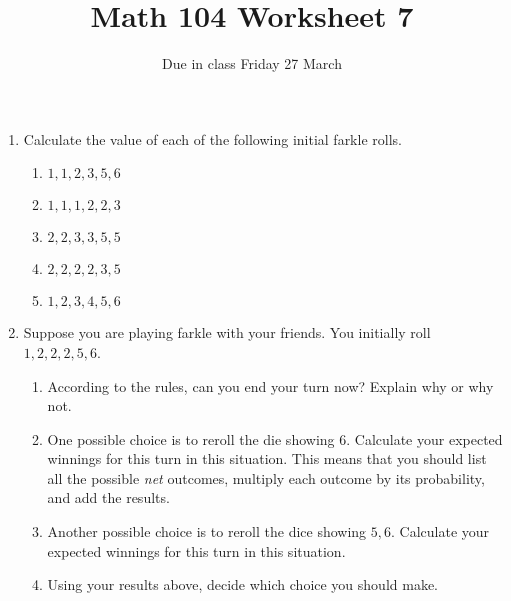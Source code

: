 \documentclass[12pt]{article}
\author{}\date{Due in class Friday 27 March}
\title{Math 104 Worksheet 7}\author{}
\begin{document}
\maketitle
\thispagestyle{empty}
\begin{enumerate}
\item Calculate the value of each of the following
initial farkle rolls.
\begin{enumerate}
\item $1,1,2,3,5,6$
\item $1,1,1,2,2,3$
\item $2,2,3,3,5,5$
\item $2,2,2,2,3,5$
\item $1,2,3,4,5,6$
\end{enumerate}

\item Suppose you are playing farkle with your
friends. You initially roll $1,2,2,2,5,6$.
\begin{enumerate}
\item According to the rules, can you end your turn now?
Explain why or why not.
\vspace{1cm}
\item One possible choice is to reroll the die showing 6.
Calculate your expected winnings for this turn in
this situation.
This means that you should list all the possible {\em net}
outcomes, multiply each outcome by its probability,
and add the results.
\vspace{3cm}
\item Another possible choice is to reroll
the dice showing $5,6$.
Calculate your expected winnings for this turn in
this situation.
\vspace{3cm}
\item Using your results above, decide which
choice you should make.
\end{enumerate}
\end{enumerate}
\end{document}
